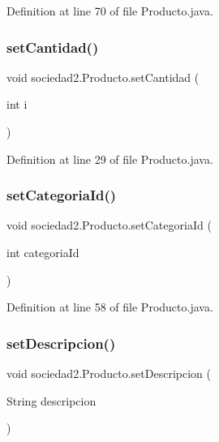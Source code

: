 Definition at line 70 of file Producto.\+java.

\mbox{\label{classsociedad2_1_1_producto_a6eec5e912ac94e10b15bc0a1e62d3a97}} 
\subsubsection{\texorpdfstring{set\+Cantidad()}{setCantidad()}}
{\footnotesize\ttfamily void sociedad2.\+Producto.\+set\+Cantidad (\begin{DoxyParamCaption}\item[{int}]{i }\end{DoxyParamCaption})}



Definition at line 29 of file Producto.\+java.

\mbox{\label{classsociedad2_1_1_producto_a7b59257499e49df811a7e00bcfe3768a}} 
\subsubsection{\texorpdfstring{set\+Categoria\+Id()}{setCategoriaId()}}
{\footnotesize\ttfamily void sociedad2.\+Producto.\+set\+Categoria\+Id (\begin{DoxyParamCaption}\item[{int}]{categoria\+Id }\end{DoxyParamCaption})}



Definition at line 58 of file Producto.\+java.

\mbox{\label{classsociedad2_1_1_producto_a97c84a0e5bafd15bdc48f868d088fde7}} 
\subsubsection{\texorpdfstring{set\+Descripcion()}{setDescripcion()}}
{\footnotesize\ttfamily void sociedad2.\+Producto.\+set\+Descripcion (\begin{DoxyParamCaption}\item[{String}]{descripcion }\end{DoxyParamCaption})}



